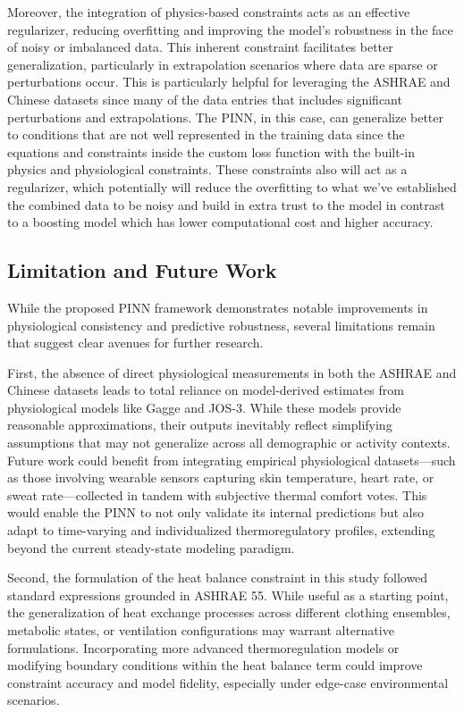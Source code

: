 Moreover, the integration of physics-based constraints acts as an effective regularizer, reducing overfitting and improving the model’s robustness in the face of noisy or imbalanced data. This inherent constraint facilitates better generalization, particularly in extrapolation scenarios where data are sparse or perturbations occur. This is particularly helpful for leveraging the ASHRAE and Chinese datasets since many of the data entries that includes significant perturbations and extrapolations. The PINN, in this case, can generalize better to conditions that are not well represented in the training data since the equations and constraints inside the custom loss function with the built-in physics and physiological constraints. These constraints also will act as a regularizer, which potentially will reduce the overfitting to what we've established the combined data to be noisy and build in extra trust to the model in contrast to a boosting model which has lower computational cost and higher accuracy.

\subsection{Limitation and Future Work}
While the proposed PINN framework demonstrates notable improvements in physiological consistency and predictive robustness, several limitations remain that suggest clear avenues for further research.

First, the absence of direct physiological measurements in both the ASHRAE and Chinese datasets leads to total reliance on model-derived estimates from physiological models like Gagge and JOS-3. While these models provide reasonable approximations, their outputs inevitably reflect simplifying assumptions that may not generalize across all demographic or activity contexts. Future work could benefit from integrating empirical physiological datasets—such as those involving wearable sensors capturing skin temperature, heart rate, or sweat rate—collected in tandem with subjective thermal comfort votes. This would enable the PINN to not only validate its internal predictions but also adapt to time-varying and individualized thermoregulatory profiles, extending beyond the current steady-state modeling paradigm.

Second, the formulation of the heat balance constraint in this study followed standard expressions grounded in ASHRAE 55. While useful as a starting point, the generalization of heat exchange processes across different clothing ensembles, metabolic states, or ventilation configurations may warrant alternative formulations. Incorporating more advanced thermoregulation models or modifying boundary conditions within the heat balance term could improve constraint accuracy and model fidelity, especially under edge-case environmental scenarios.

